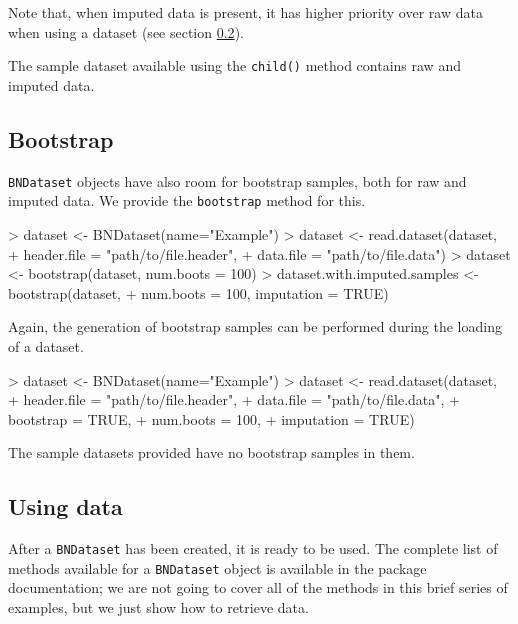 \documentclass{article}
\newcommand{\Robject}[1]{{\texttt{#1}}}
\newcommand{\Rmethod}[1]{{\texttt{#1}}}
\begin{document}
Note that, when imputed data is present, it has higher priority over raw data when using a dataset
(see section \ref{sec:usingdata}).

The sample dataset available using the \Rmethod{child()} method contains raw and imputed data.

\subsection{Bootstrap}
\Robject{BNDataset} objects have also room for bootstrap samples, both for raw and imputed data.
We provide the \Rmethod{bootstrap} method for this.
\begin{Schunk}
\begin{Sinput}
> dataset <- BNDataset(name="Example")
> dataset <- read.dataset(dataset,
+                         header.file = "path/to/file.header",
+                         data.file   = "path/to/file.data")
> dataset <- bootstrap(dataset, num.boots = 100)
> dataset.with.imputed.samples <- bootstrap(dataset,
+                             num.boots = 100, imputation = TRUE)
\end{Sinput}
\end{Schunk}

Again, the generation of bootstrap samples can be performed during the loading of a dataset.
\begin{Schunk}
\begin{Sinput}
> dataset <- BNDataset(name="Example")
> dataset <- read.dataset(dataset,
+                         header.file = "path/to/file.header",
+                         data.file   = "path/to/file.data",
+                         bootstrap   = TRUE,
+                         num.boots   = 100,
+                         imputation  = TRUE)
\end{Sinput}
\end{Schunk}

The sample datasets provided have no bootstrap samples in them.

\subsection{Using data}
\label{sec:usingdata}
After a \Robject{BNDataset} has been created, it is ready to be used.
The complete list of methods available for a \Robject{BNDataset} object is available
in the package documentation; we are not going to cover all of the methods in this brief series
of examples, but we just show how to retrieve data.
\end{document}
